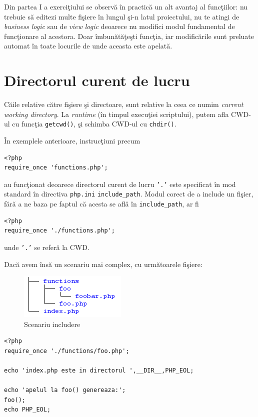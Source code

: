 Din partea I a exerciţiului se observă în practică un alt avantaj
al funcţiilor: nu trebuie să editezi multe fişiere în lungul
şi-n latul proiectului, nu te atingi de \textit{business logic}
sau de \textit{view logic} deoarece nu modifici modul fundamental de funcţionare
al acestora. Doar îmbunătăţeşti funcţia, iar
modificările sunt preluate automat în toate locurile de unde
aceasta este apelată.

\section{Directorul curent de lucru}
Căile relative către fişiere şi directoare,
sunt relative la ceea ce numim \textsl{current working
directory}. La \textsl{runtime} (în timpul execuţiei
scriptului), putem afla CWD-ul cu
funcţia \texttt{getcwd()}, şi schimba CWD-ul cu \texttt{chdir()}.

În exemplele anterioare, instrucţiuni precum
\begin{lstlisting}
<?php
require_once 'functions.php';
\end{lstlisting}
au funcţionat deoarece directorul curent de lucru \texttt{'.'}
este specificat în mod standard în directiva \texttt{php.ini}
\texttt{include\_path}. Modul corect de a include un fişier, fără
a ne baza pe faptul că acesta se află în \texttt{include\_path}, ar fi
\begin{lstlisting}
<?php
require_once './functions.php';
\end{lstlisting}
unde \texttt{'.'} se referă la CWD.

Dacă avem însă un scenariu mai complex, cu următoarele fişiere:
\begin{figure}[h!]
  \centering
    \includegraphics[scale=.7]{cap03/cwdtree.png}
  \caption{Scenariu includere}
  \label{fig:cwdtree}
\end{figure}

\begin{lstlisting}[title=index.php]
<?php
require_once './functions/foo.php';

echo 'index.php este in directorul ',__DIR__,PHP_EOL;

echo 'apelul la foo() genereaza:';
foo();
echo PHP_EOL;
\end{lstlisting}

